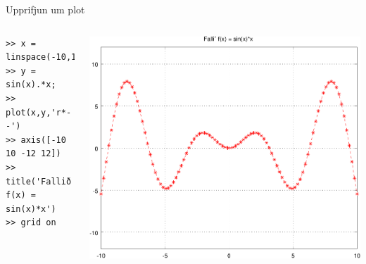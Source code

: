 \documentclass{beamer}
\begin{document}
\begin{frame}[fragile]{Upprifjun um plot}
\begin{columns}
\begin{verbatim}
>> x = linspace(-10,10);
>> y = sin(x).*x;
>> plot(x,y,'r*--')
>> axis([-10 10 -12 12])
>> title('Fallið f(x) = sin(x)*x')
>> grid on
\end{verbatim}
\includegraphics[width=\linewidth]{../Pics/sintimesx}
\end{columns}
\end{frame}
\end{document}
